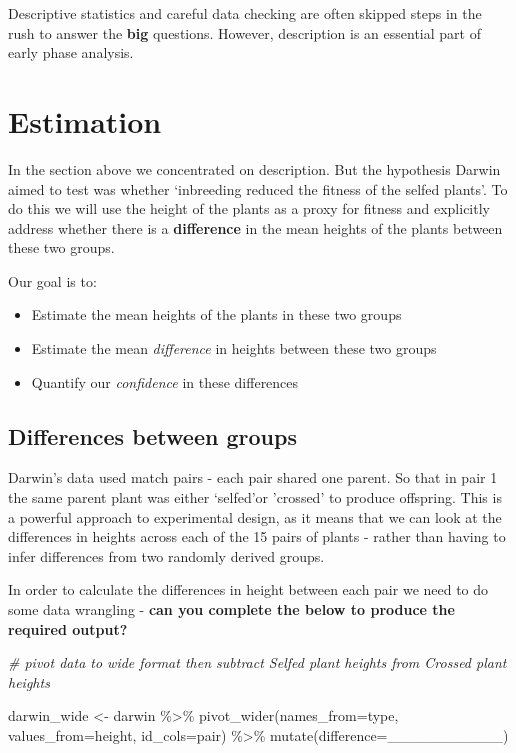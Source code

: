 \documentclass[
]{book}
\newenvironment{Shaded}{\begin{snugshade}}{\end{snugshade}}
\newcommand{\AttributeTok}[1]{\textcolor[rgb]{0.77,0.63,0.00}{#1}}
\newcommand{\CommentTok}[1]{\textcolor[rgb]{0.56,0.35,0.01}{\textit{#1}}}
\newcommand{\FunctionTok}[1]{\textcolor[rgb]{0.00,0.00,0.00}{#1}}
\newcommand{\NormalTok}[1]{#1}
\newcommand{\OtherTok}[1]{\textcolor[rgb]{0.56,0.35,0.01}{#1}}
\newcommand{\SpecialCharTok}[1]{\textcolor[rgb]{0.00,0.00,0.00}{#1}}
\begin{document}
Descriptive statistics and careful data checking are often skipped steps in the rush to answer the \textbf{big} questions. However, description is an essential part of early phase analysis.

\hypertarget{estimation}{%
\section{Estimation}\label{estimation}}

In the section above we concentrated on description. But the hypothesis Darwin aimed to test was whether `inbreeding reduced the fitness of the selfed plants'. To do this we will use the height of the plants as a proxy for fitness and explicitly address whether there is a \textbf{difference} in the mean heights of the plants between these two groups.

Our goal is to:

\begin{itemize}
\item
  Estimate the mean heights of the plants in these two groups
\item
  Estimate the mean \emph{difference} in heights between these two groups
\item
  Quantify our \emph{confidence} in these differences
\end{itemize}

\hypertarget{differences-between-groups}{%
\subsection{Differences between groups}\label{differences-between-groups}}

Darwin's data used match pairs - each pair shared one parent. So that in pair 1 the same parent plant was either `selfed'or 'crossed' to produce offspring. This is a powerful approach to experimental design, as it means that we can look at the differences in heights across each of the 15 pairs of plants - rather than having to infer differences from two randomly derived groups.

In order to calculate the differences in height between each pair we need to do some data wrangling - \textbf{can you complete the below to produce the required output?}

\begin{Shaded}
\begin{Highlighting}[]
\CommentTok{\# pivot data to wide format then subtract Selfed plant heights from Crossed plant heights}

\NormalTok{darwin\_wide }\OtherTok{\textless{}{-}}\NormalTok{ darwin }\SpecialCharTok{\%\textgreater{}\%} 
  \FunctionTok{pivot\_wider}\NormalTok{(}\AttributeTok{names\_from=}\NormalTok{type, }\AttributeTok{values\_from=}\NormalTok{height, }\AttributeTok{id\_cols=}\NormalTok{pair) }\SpecialCharTok{\%\textgreater{}\%} 
  \FunctionTok{mutate}\NormalTok{(}\AttributeTok{difference=}\NormalTok{\_\_\_\_\_\_\_\_\_\_\_)}
\end{Highlighting}
\end{Shaded}
\end{document}

